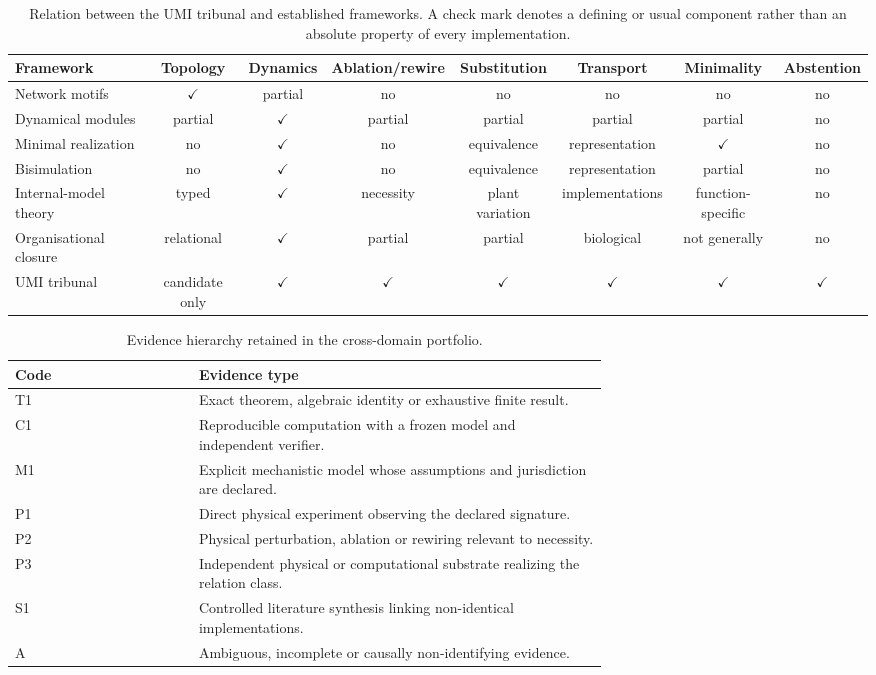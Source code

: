 \begin{table}[htbp]
\centering
\scriptsize
\caption{Relation between the UMI tribunal and established frameworks. A check mark denotes a defining or usual component rather than an absolute property of every implementation.}
\label{tab:comparators}
\begin{tabular}{lccccccc}
\toprule
Framework & Topology & Dynamics & Ablation/rewire & Substitution & Transport & Minimality & Abstention \\
\midrule
Network motifs & $\checkmark$ & partial & no & no & no & no & no \\
Dynamical modules & partial & $\checkmark$ & partial & partial & partial & partial & no \\
Minimal realization & no & $\checkmark$ & no & equivalence & representation & $\checkmark$ & no \\
Bisimulation & no & $\checkmark$ & no & equivalence & representation & partial & no \\
Internal-model theory & typed & $\checkmark$ & necessity & plant variation & implementations & function-specific & no \\
Organisational closure & relational & $\checkmark$ & partial & partial & biological & not generally & no \\
UMI tribunal & candidate only & $\checkmark$ & $\checkmark$ & $\checkmark$ & $\checkmark$ & $\checkmark$ & $\checkmark$ \\
\bottomrule
\end{tabular}
\end{table}

\begin{table}[htbp]
\centering
\small
\caption{Evidence hierarchy retained in the cross-domain portfolio.}
\label{tab:evidence-hierarchy}
\begin{tabular}{lp{0.69\linewidth}}
\toprule
Code & Evidence type \\
\midrule
T1 & Exact theorem, algebraic identity or exhaustive finite result. \\
C1 & Reproducible computation with a frozen model and independent verifier. \\
M1 & Explicit mechanistic model whose assumptions and jurisdiction are declared. \\
P1 & Direct physical experiment observing the declared signature. \\
P2 & Physical perturbation, ablation or rewiring relevant to necessity. \\
P3 & Independent physical or computational substrate realizing the relation class. \\
S1 & Controlled literature synthesis linking non-identical implementations. \\
A & Ambiguous, incomplete or causally non-identifying evidence. \\
\bottomrule
\end{tabular}
\end{table}

